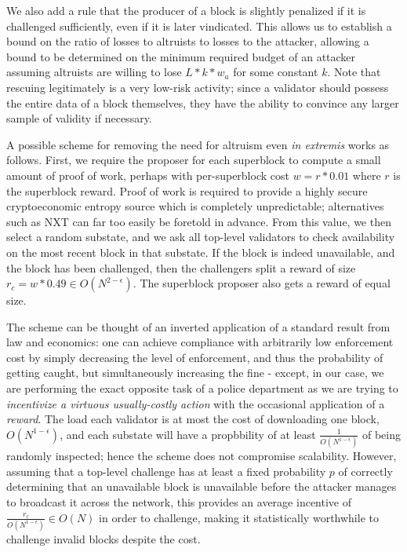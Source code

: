 \documentclass[11pt,a4paper]{report}
\theoremstyle{plain}
\theoremstyle{definition}
\theoremstyle{remark}
\begin{document}
We also add a rule that the producer of a block is slightly penalized if it is challenged sufficiently, even if it is later vindicated. This allows us to establish a bound on the ratio of losses to altruists to losses to the attacker, allowing a bound to be determined on the minimum required budget of an attacker assuming altruists are willing to lose $L * k * w_a$ for some constant $k$. Note that rescuing legitimately is a very low-risk activity; since a validator should possess the entire data of a block themselves, they have the ability to convince any larger sample of validity if necessary.

A possible scheme for removing the need for altruism even \emph{in extremis} works as follows. First, we require the proposer for each superblock to compute a small amount of proof of work, perhaps with per-superblock cost $w = r * 0.01$ where $r$ is the superblock reward. Proof of work is required to provide a highly secure cryptoeconomic entropy source which is completely unpredictable; alternatives such as NXT can far too easily be foretold in advance. From this value, we then select a random substate, and we ask all top-level validators to check availability on the most recent block in that substate. If the block is indeed unavailable, and the block has been challenged, then the challengers split a reward of size $r_c = w * 0.49 \in O(N^{2-\epsilon})$. The superblock proposer also gets a reward of equal size.

The scheme can be thought of an inverted application of a standard result from law and economics: one can achieve compliance with arbitrarily low enforcement cost by simply decreasing the level of enforcement, and thus the probability of getting caught, but simultaneously increasing the fine\cite{econofcrime} - except, in our case, we are performing the exact opposite task of a police department as we are trying to \emph{incentivize a virtuous usually-costly action} with the occasional application of a \emph{reward}. The load each validator is at most the cost of downloading one block, $O(N^{1-\epsilon})$, and each substate will have a propbbility of at least $\frac{1}{O(N^{1-\epsilon})}$ of being randomly inspected; hence the scheme does not compromise scalability. However, assuming that a top-level challenge has at least a fixed probability $p$ of correctly determining that an unavailable block is unavailable before the attacker manages to broadcast it across the network, this provides an average incentive of $\frac{r_c}{O(N^{1-\epsilon})} \in O(N)$ in order to challenge, making it statistically worthwhile to challenge invalid blocks despite the cost.
\end{document}
